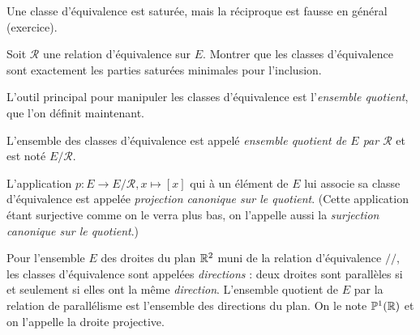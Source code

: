 \begin{exemple}
Une classe d'équivalence est saturée, mais la réciproque est fausse en général (exercice).
\end{exemple}

\begin{exercice}
Soit $\mathcal R$ une relation d'équivalence sur $E$. Montrer que les classes d'équivalence sont exactement les parties saturées minimales pour l'inclusion.
\end{exercice}


L'outil principal pour manipuler les classes d'équivalence est l'\emph{ensemble quotient}, que l'on définit maintenant.

\begin{definition}[Quotient]

L'ensemble des classes d'équivalence est appelé \emph{ensemble quotient de $E$ par $\mathcal R$} et est noté $E/{\mathcal R}$.

L'application $p : E \to E/\mathcal R, x\mapsto [x]$ qui à un élément de $E$ lui associe sa classe d'équivalence est appelée  \emph{projection canonique sur le quotient}. (Cette application étant surjective comme on le verra plus bas, on l'appelle aussi la \emph{surjection canonique sur le quotient}.)
\end{definition}

\begin{exemple}
Pour l'ensemble $E$ des droites du plan $\mathbb{R}^2$ muni de la relation d'équivalence $//$, les classes d'équivalence sont appelées \emph{directions} : deux droites sont parallèles si et seulement si elles ont la même \emph{direction}. L'ensemble quotient de $E$ par la relation de parallélisme est l'ensemble des directions du plan. On le note $\mathbb{P}^1(\mathbb{R})$ et on l'appelle la droite projective.
\end{exemple}

